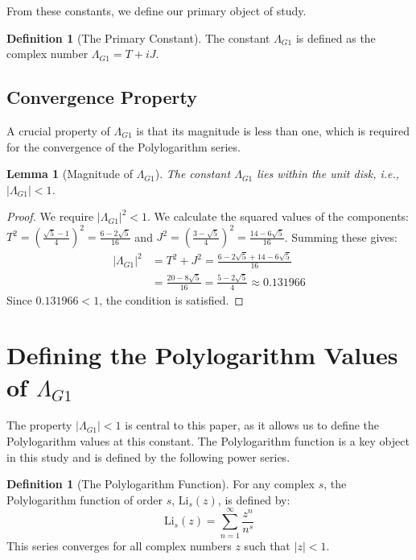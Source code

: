 \documentclass{amsart}
\theoremstyle{plain}
\newtheorem{lemma}[theorem]{Lemma}
\theoremstyle{definition}
\newtheorem{definition}[theorem]{Definition}
\theoremstyle{remark}
\newcommand{\LambdaG}{\Lambda_{G1}}
\begin{document}
From these constants, we define our primary object of study.
\begin{definition}[The Primary Constant]
The constant $\LambdaG$ is defined as the complex number $\LambdaG = T+iJ$.
\end{definition}

\subsection{Convergence Property}
A crucial property of $\LambdaG$ is that its magnitude is less than one, which is required for the convergence of the Polylogarithm series.

\begin{lemma}[Magnitude of $\LambdaG$]
\label{lem:convergence}
The constant $\LambdaG$ lies within the unit disk, i.e., $|\LambdaG| < 1$.
\end{lemma}
\begin{proof}
We require $|\LambdaG|^2 < 1$. We calculate the squared values of the components:
$T^2 = \left(\frac{\sqrt{5}-1}{4}\right)^2 = \frac{6-2\sqrt{5}}{16}$ and $J^2 = \left(\frac{3-\sqrt{5}}{4}\right)^2 = \frac{14-6\sqrt{5}}{16}$.
Summing these gives:
\begin{align*}
    |\LambdaG|^2 &= T^2+J^2 = \frac{6-2\sqrt{5} + 14-6\sqrt{5}}{16} \\
                 &= \frac{20-8\sqrt{5}}{16} = \frac{5-2\sqrt{5}}{4} \approx 0.131966
\end{align*}
Since $0.131966 < 1$, the condition is satisfied.
\end{proof}

\section{Defining the Polylogarithm Values of \texorpdfstring{$\LambdaG$}{Lambda\_G1}}
The property $|\LambdaG| < 1$ is central to this paper, as it allows us to define the Polylogarithm values at this constant. The Polylogarithm function is a key object in this study and is defined by the following power series.

\begin{definition}[The Polylogarithm Function]
For any complex $s$, the Polylogarithm function of order $s$, $\mathrm{Li}_s(z)$, is defined by:
$$ \mathrm{Li}_s(z) = \sum_{n=1}^{\infty} \frac{z^n}{n^s} $$
This series converges for all complex numbers $z$ such that $|z|<1$.
\end{definition}
\end{document}
